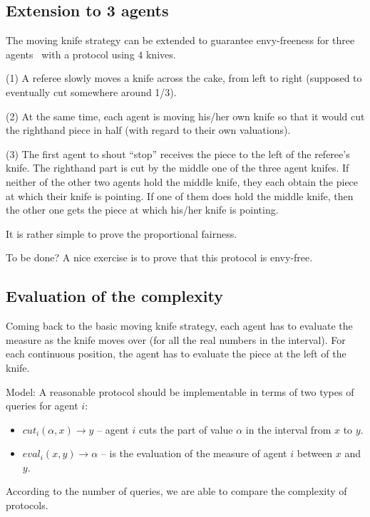 \subsection{Extension to 3 agents}

The moving knife strategy can be extended to guarantee envy-freeness for three agents~\cite{Stromquist}
with a protocol using $4$ knives.

(1) A referee slowly moves a knife across the cake, from left to right
(supposed to eventually cut somewhere around 1/3).

(2) At the same time, each agent is moving his/her own knife so that it would cut the righthand piece in half 
(with regard to their own valuations).

(3) The first agent to shout “stop” receives the piece to the left of the referee’s knife. 
The righthand part is cut by the middle one of the three agent knifes. 
If neither of the other two agents hold the middle knife, they each obtain the piece at which their knife is pointing. 
If one of them does hold the middle knife, then the other one gets the piece at which his/her knife is pointing.
\bigskip

It is rather simple to prove the proportional fairness.
\bigskip

{\Denis To be done?}
A nice exercise is to prove that this protocol is envy-free. 


\subsection{Evaluation of the complexity}

Coming back to the basic moving knife strategy, each agent has to evaluate the measure as the knife moves over (for all the real numbers in the interval). 
For each continuous position, the agent has to evaluate the piece at the left of the knife.

Model:
 A reasonable protocol should be implementable in terms of two types of queries for agent $i$:
 
 \begin{itemize}
 \item $cut_i(\alpha,x) \rightarrow y$ -- agent $i$ cuts the part of value $\alpha$ in the interval from $x$ to $y$. 
 \item $eval_i(x,y) \rightarrow \alpha$ -- is the evaluation of the measure of agent $i$  between $x$ and $y$.
 \end{itemize}
 
 According to the number of queries, we are able to compare the complexity of protocols.

